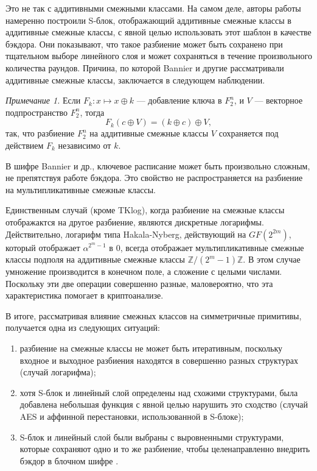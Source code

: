Это не так с аддитивными смежными классами. На самом деле, авторы работы \cite{BBF16} намеренно построили S-блок, отображающий аддитивные смежные классы в аддитивные смежные классы, с явной целью использовать этот шаблон в качестве бэкдора. Они показывают, что такое разбиение может быть сохранено при тщательном выборе линейного слоя и может сохраняться в течение произвольного количества раундов. Причина, по которой Bannier и другие рассматривали аддитивные смежные классы, заключается в следующем наблюдении.

\textit{Примечание 1.} Если \(F_k: x \mapsto x \oplus k\) — добавление ключа в $F^n_2$, и \(V\) — векторное подпространство $F^n_2$, тогда
\[
F_k(c \oplus V) = (k \oplus c) \oplus V,
\]
так, что разбиение $F^n_2$ на аддитивные смежные классы \(V\) сохраняется под действием \(F_k\) независимо от \(k\).

В шифре Bannier и др., ключевое расписание может быть произвольно сложным, не препятствуя работе бэкдора. Это свойство не распространяется на разбиение на мультипликативные смежные классы.

Единственным случай (кроме TKlog), когда разбиение на смежные классы отображактся на другое разбиение, являются дискретные логарифмы. Действительно, логарифм типа Hakala-Nyberg, действующий на $GF(2^{2m})$, который отображает \(\alpha^{2^m-1}\) в $0$, всегда отображает мультипликативные смежные классы подполя на аддитивные смежные классы $\mathbb{Z}/(2^m - 1)\mathbb{Z}$. В этом случае умножение производится в конечном поле, а сложение с целыми числами. Поскольку эти две операции совершенно разные, маловероятно, что эта характеристика помогает в криптоанализе.

В итоге, рассматривая влияние смежных классов на симметричные примитивы, получается одна из следующих ситуаций:
\begin{enumerate}
    \item разбиение на смежные классы не может быть итеративным, поскольку входное и выходное разбиения находятся в совершенно разных структурах (случай логарифма);
    \item хотя S-блок и линейный слой определены над схожими структурами, была добавлена небольшая функция с явной целью нарушить это сходство (случай AES и аффинной перестановки, использованной в S-блоке);
    \item S-блок и линейный слой были выбраны с выровненными структурами, которые сохраняют одно и то же разбиение, чтобы целенаправленно внедрить бэкдор в блочном шифре \cite{BBF16}.
\end{enumerate}

